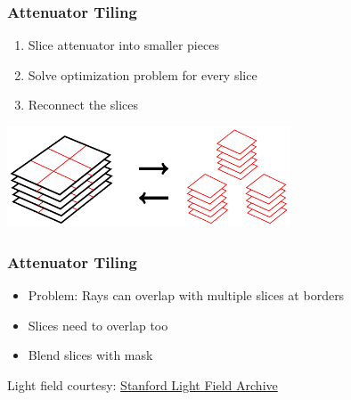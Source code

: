 \documentclass[12pt, compress]{beamer}
\begin{document}
\begin{frame}[fragile]
	\frametitle{Attenuator Tiling}
	
	\begin{enumerate}
		\item Slice attenuator into smaller pieces
		\item Solve optimization problem for every slice
		\item Reconnect the slices
	\end{enumerate}
	
	\vspace{1cm}
	
	\begin{center}
		\includegraphics[height = 3cm]{figures/slicing_attenuator/tiling_overview.pdf}
	\end{center}
\end{frame}

\begin{frame}[fragile]
	\frametitle{Attenuator Tiling}

	\begin{itemize}
		\item Problem: Rays can overlap with multiple slices at borders
		\item Slices need to overlap too
		\item Blend slices with mask
	\end{itemize}
	
	\begin{figure}
		\hspace{1cm}
	\end{figure}
	
	{\scriptsize Light field courtesy: \href{http://lightfield.stanford.edu/lfs.html}{Stanford Light Field Archive}}
\end{frame}
\end{document}
